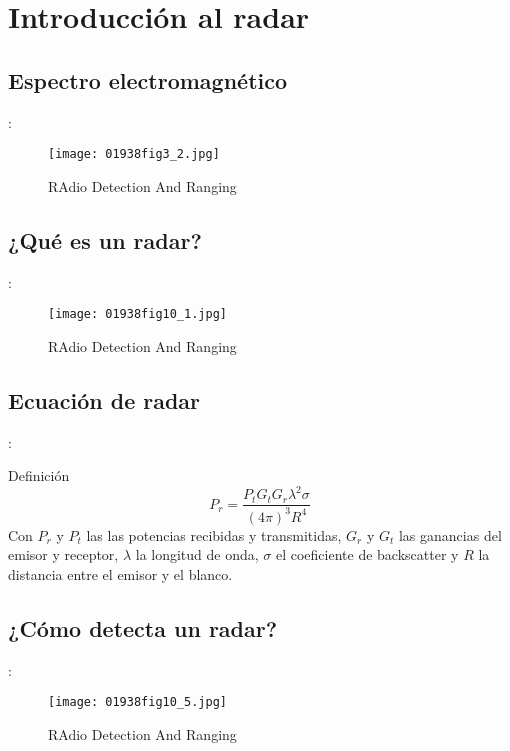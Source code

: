 \section{Introducción al radar}
\subsection{Espectro electromagnético}
\begin{frame}{\secname : \subsecname}
  \begin{figure}
    \centering
    \texttt{[image: 01938fig3\_2.jpg]}
    \caption{RAdio Detection And Ranging}
    \label{}
  \end{figure}
\end{frame}

\subsection{¿Qué es un radar?}
\begin{frame}{\secname : \subsecname}
    \begin{figure}
      \centering
      \texttt{[image: 01938fig10\_1.jpg]}
      \caption{RAdio Detection And Ranging}
      \label{}
    \end{figure}
\end{frame}

\subsection{Ecuación de radar}
\begin{frame}{\secname : \subsecname}
    \begin{block}{Definición}
      \begin{equation}
        P_r = \frac{P_t G_t G_r \lambda^2 \sigma}{(4\pi)^3 R^4}
      \end{equation}
      Con $P_r$ y $P_t$ las las potencias recibidas y transmitidas, $G_r$ y $G_t$ las ganancias del emisor y receptor, $\lambda$ la longitud de onda, $\sigma$ el coeficiente de backscatter y $R$ la distancia entre el emisor y el blanco.
    \end{block}
\end{frame}

\subsection{¿Cómo detecta un radar?}
\begin{frame}{\secname : \subsecname}
  \begin{figure}
    \centering
    \texttt{[image: 01938fig10\_5.jpg]}
    \caption{RAdio Detection And Ranging}
    \label{}
  \end{figure}
\end{frame}


